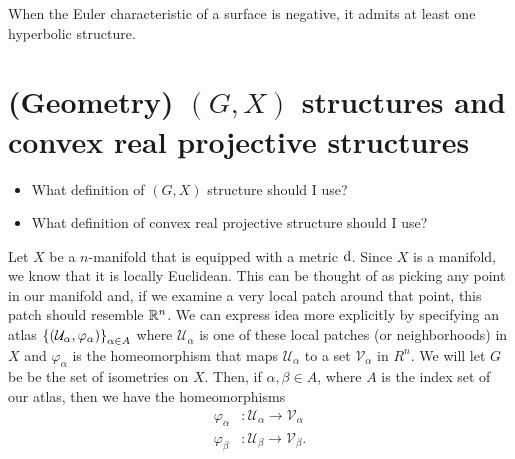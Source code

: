 \documentclass{amsart}
\begin{document}
	
	\begin{theorem}
		When the Euler characteristic of a surface is negative, it admits at least one hyperbolic structure.
	\end{theorem}
	
	\section{(Geometry) $(G,X)$ structures and convex real projective structures}
	
	\begin{tcolorbox}[colback=myblue]
		\begin{itemize}
			\item What definition of $(G,X)$ structure should I use?
			\item What definition of convex real projective structure should I use?
		\end{itemize}
	\end{tcolorbox}
	Let $X$ be a $n$-manifold that is equipped with a metric $\operatorname{d}$. Since $X$ is a manifold, we know that it is locally Euclidean. This can be thought of as picking any point in our manifold and, if we examine a very local patch around that point, this patch should resemble $\mathbb{R}^n$. We can express idea more explicitly by specifying an atlas $\left\{(\mathcal{U}_\alpha, \varphi_\alpha)\right\}_{\alpha \in A}$ where $\mathcal{U}_\alpha$ is one of these local patches (or neighborhoods) in $X$ and $\varphi_\alpha$ is the homeomorphism that maps $\mathcal{U}_\alpha$ to a set $\mathcal{V}_\alpha$ in $R^n$. We will let $G$ be be the set of isometries on $X$. Then, if $\alpha, \beta \in A$, where $A$ is the index set of our atlas, then we have the homeomorphisms
	\begin{equation*}
		\begin{split}
			\varphi_\alpha &\colon \mathcal{U}_\alpha \to \mathcal{V}_\alpha \\
			\varphi_\beta &\colon \mathcal{U}_\beta \to \mathcal{V}_\beta.
		\end{split}
	\end{equation*}
	
\end{document}
